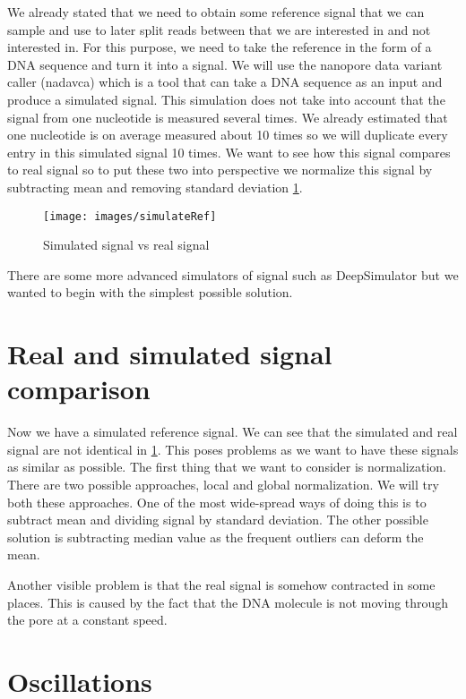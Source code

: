 We already stated that we need to obtain some reference signal that we
can sample and use to later split reads between that we are interested in and not
interested in. For this purpose, we need to take the reference in the form of a DNA sequence
and turn it into a signal. We will use the nanopore data
variant caller (nadavca) which is a tool that can take a DNA sequence as an input
and produce a simulated signal. This simulation does not take into account that
the signal from one nucleotide is measured several times. We already estimated
that one nucleotide is on average measured about 10 times so we will duplicate every
entry in this simulated signal 10 times. We want to see how this signal compares
to real signal so to put these two into perspective we normalize this signal by
subtracting mean and removing standard deviation \ref{obr:simVsReal}.

\begin{figure}
\centerline{\texttt{[image: images/simulateRef]}}
\caption[Hehe]{Simulated signal vs real signal}
\label{obr:simVsReal}
\end{figure}

There are some more advanced simulators of signal such as DeepSimulator but we
wanted to begin with the simplest possible solution.

\section{Real and simulated signal comparison}

Now we have a simulated reference signal. We can see that the simulated and real
signal are not identical in \ref{obr:simVsReal}. This poses problems as we want to have these signals as
similar as possible. The first thing that we want to consider is normalization. There
are two possible approaches, local and global normalization. We will try both these
approaches. One of the most wide-spread ways of doing this is to subtract mean and dividing
signal by standard deviation. The other possible solution is subtracting median value
as the frequent outliers can deform the mean. 

Another visible problem is that the real signal is somehow contracted
in some places. This is caused by the fact that the DNA molecule is not moving
through the pore at a constant speed. 

\section{Oscillations}

